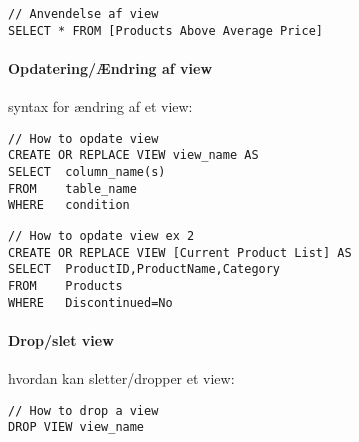 \begin{lstlisting}[caption=Kodeeksempel for anvendelse af View.,label=code:view]
// Anvendelse af view
SELECT * FROM [Products Above Average Price]
\end{lstlisting}

\paragraph{Opdatering/Ændring af view} syntax for ændring af et view:

\begin{lstlisting}[caption=Opdatering af view.]
// How to opdate view
CREATE OR REPLACE VIEW view_name AS
SELECT 	column_name(s)
FROM 	table_name
WHERE 	condition
\end{lstlisting}

\begin{lstlisting}[caption=Andet eksempel på opdatering af et view.]
// How to opdate view ex 2
CREATE OR REPLACE VIEW [Current Product List] AS
SELECT 	ProductID,ProductName,Category
FROM 	Products
WHERE 	Discontinued=No
\end{lstlisting}

\paragraph{Drop/slet view} hvordan kan sletter/dropper et view: 

\begin{lstlisting}[caption=Dropping af view.]
// How to drop a view
DROP VIEW view_name
\end{lstlisting}